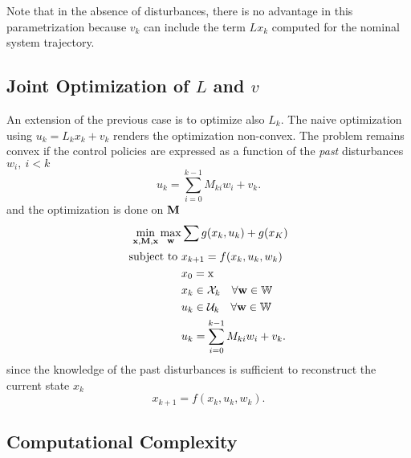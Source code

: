 Note that in the absence of disturbances, there is no advantage in this parametrization because $v_k$ can include the term $Lx_k$ computed for the nominal system trajectory.

\subsection{Joint Optimization of $L$ and $v$}
\label{sec:joint-optimization-L-v}

An extension of the previous case is to optimize also $L_k$. The naive optimization using $u_k=L_k x_k+v_k$ renders the optimization non-convex. The problem remains convex if the control policies are expressed as a function of the \emph{past} disturbances $w_i,\ i<k$
\begin{equation*}
  u_k = \sum_{i=0}^{k-1} M_{ki}w_i + v_k.
\end{equation*}
and the optimization is done on $\boldsymbol{\mathrm{M}}$
\begin{equation*}
  \begin{aligned}
    \min_{\boldsymbol{\mathrm{x}},\boldsymbol{\mathrm{M}},\boldsymbol{\mathrm{x}}} \max_{\boldsymbol{\mathrm{w}}} & \sum g(x_k,u_k) + g(x_K) \\
    \text{subject to } & x_{k+1} = f(x_k,u_k,w_k) \\
                                      & x_0 = \textrm{x} \\
                                      & x_k \in \mathcal{X}_k\quad \forall \boldsymbol{\mathrm{w}} \in \mathbb{W} \\
                                      & u_k \in \mathcal{U}_k\quad \forall \boldsymbol{\mathrm{w}} \in \mathbb{W} \\
                                      & u_k = \sum_{i=0}^{k-1} M_{ki}w_i + v_k.
  \end{aligned}
\end{equation*}
since the knowledge of the past disturbances is sufficient to reconstruct the current state $x_k$
\begin{equation*}
  x_{k+1} = f(x_k,u_k,w_k).
\end{equation*}


\subsection{Computational Complexity}
\label{sec:computational-complexity-rMPC}

